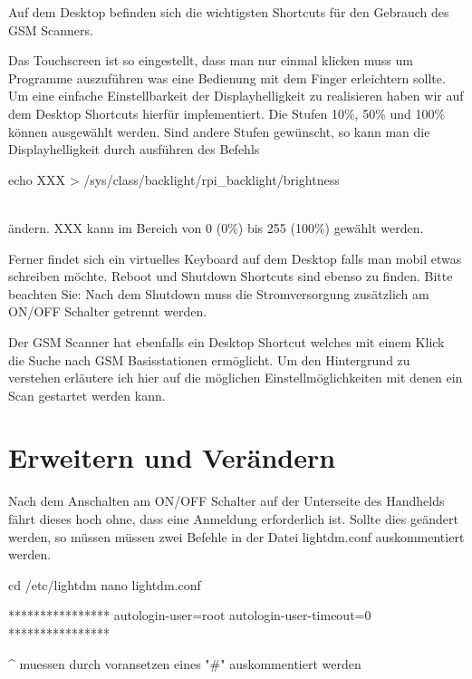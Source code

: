 Auf dem Desktop befinden sich die wichtigsten Shortcuts für den Gebrauch des GSM Scanners. 



Das Touchscreen ist so eingestellt, dass man nur einmal klicken muss um Programme auszuführen was eine Bedienung mit dem Finger erleichtern sollte. Um eine einfache Einstellbarkeit der Displayhelligkeit zu realisieren haben wir auf dem Desktop Shortcuts hierfür implementiert. Die Stufen 10\%, 50\% und 100\% können ausgewählt werden. Sind andere Stufen gewünscht, so kann man die Displayhelligkeit durch ausführen des Befehls
\begin{code}
echo XXX > /sys/class/backlight/rpi_backlight/brightness
\end{code}
\noindent\\ändern. XXX kann im Bereich von 0 (0\%) bis 255 (100\%) gewählt werden. 

Ferner findet sich ein virtuelles Keyboard auf dem Desktop falls man mobil etwas schreiben möchte. Reboot und Shutdown Shortcuts sind ebenso zu finden. Bitte beachten Sie: Nach dem Shutdown muss die Stromversorgung zusätzlich am ON/OFF Schalter getrennt werden.

Der GSM Scanner hat ebenfalls ein Desktop Shortcut welches mit einem Klick die Suche nach GSM Basisstationen ermöglicht. Um den Hintergrund zu verstehen erläutere ich hier auf die möglichen Einstellmöglichkeiten mit denen ein Scan gestartet werden kann. 

\section{Erweitern und Verändern}

Nach dem Anschalten am ON/OFF Schalter auf der Unterseite des Handhelds fährt dieses hoch ohne, dass eine Anmeldung erforderlich ist. Sollte dies geändert werden, so müssen müssen zwei Befehle in der Datei lightdm.conf auskommentiert werden. 
\begin{code}
cd /etc/lightdm
nano lightdm.conf

****************
autologin-user=root
autologin-user-timeout=0
****************

^ muessen durch voransetzen eines "#" auskommentiert werden
\end{code}


